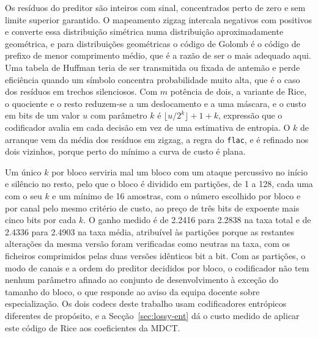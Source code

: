 \documentclass[a4paper,11pt]{article}
\newcommand{\prog}[1]{\texttt{#1}}
\begin{document}
Os resíduos do preditor são inteiros com sinal, concentrados perto de zero e sem
limite superior garantido. O mapeamento zigzag intercala negativos com positivos
e converte essa distribuição simétrica numa distribuição aproximadamente
geométrica, e para distribuições geométricas o código de Golomb é o código de
prefixo de menor comprimento médio, que é a razão de ser o mais adequado aqui.
Uma tabela de Huffman teria de ser transmitida ou fixada de antemão e perde
eficiência quando um símbolo concentra probabilidade muito alta, que é o caso
dos resíduos em trechos silenciosos. Com $m$ potência de dois, a variante de
Rice, o quociente e o resto reduzem-se a um deslocamento e a uma máscara, e o
custo em bits de um valor $u$ com parâmetro $k$ é
$\lfloor u/2^{k} \rfloor + 1 + k$, expressão que o codificador avalia em cada
decisão em vez de uma estimativa de entropia. O $k$ de arranque vem da média dos
resíduos em zigzag, a regra do \prog{flac}, e é refinado nos dois vizinhos,
porque perto do mínimo a curva de custo é plana.

Um único $k$ por bloco serviria mal um bloco com um ataque percussivo no início
e silêncio no resto, pelo que o bloco é dividido em partições, de \num{1} a
\num{128}, cada uma com o seu $k$ e um mínimo de \num{16} amostras, com o número
escolhido por bloco e por canal pelo mesmo critério de custo, ao preço de três
bits de expoente mais cinco bits por cada $k$. O ganho medido é de \num{2,2416}
para \num{2,2838} na taxa total e de \num{2,4336} para \num{2,4903} na taxa
média, atribuível às partições porque as restantes alterações da mesma versão
foram verificadas como neutras na taxa, com os ficheiros comprimidos pelas duas
versões idênticos bit a bit. Com as partições, o modo de canais e a ordem do
preditor decididos por bloco, o codificador não tem nenhum parâmetro afinado ao
conjunto de desenvolvimento à exceção do tamanho do bloco, o que responde ao
aviso da equipa docente sobre especialização. Os dois codecs deste trabalho usam
codificadores entrópicos diferentes de propósito, e a Secção~\ref{sec:lossy-ent}
dá o custo medido de aplicar este código de Rice aos coeficientes da MDCT.
\end{document}
